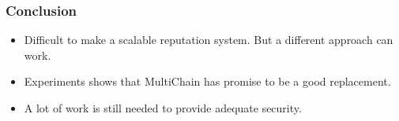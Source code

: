 \documentclass{beamer}
\begin{document}
\begin{frame}
\frametitle{Conclusion}
\begin{itemize}
    \item{Difficult to make a scalable reputation system. But a different approach can work.}
    \pause \item{Experiments shows that MultiChain has promise to be a good replacement.}
    \pause \item{A lot of work is still needed to provide adequate security.}
\end{itemize}
\end{frame}
\end{document}
